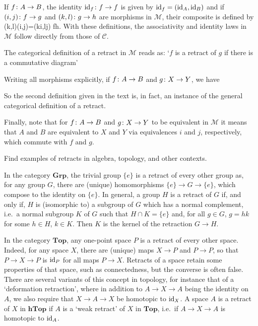 If $f\colon A\to B$, the identity $\mathrm{id}_f\colon f\to f$ is given by $\mathrm{id}_f=(\mathrm{id}_A,\mathrm{id}_B)$ and if $(i,j)\colon f\to g$ and $(k,l)\colon g\to h$ are morphisms in $\mathcal{M}$, their composite is defined by
\bse
(k,l)\circ (i,j)=(k\circ i,l\circ j) \cl f\to h.
\ese
With these definitions, the associativity and identity laws in $\mathcal{M}$ follow directly from those of $\mathcal{C}$.

The categorical definition of a retract in $\mathcal{M}$ reads as: `$f$ is a retract of $g$ if there is a commutative diagram'
\bse
{}
\ese
Writing all morphisms explicitly, if $f\colon A\to B$ and $g\colon X\to Y$, we have
\bse
{}
\ese
So the second definition given in the text is, in fact, an instance of the general categorical definition of a retract.

Finally, note that for $f\colon A\to B$ and $g\colon X\to Y$ to be equivalent in $\mathcal{M}$ it means that $A$ and $B$ are equivalent to $X$ and $Y$ via equivalences $i$ and $j$, respectively, which commute with $f$ and $g$.
\es

\bx
Find examples of retracts in algebra, topology, and other contexts.
\ex

\bs
In the category $\mathbf{Grp}$, the trivial group $\{e\}$ is a retract of every other group as, for any group $G$, there are (unique) homomorphisms $\{e\} \to G \to \{e\}$, which compose to the identity on $\{e\}$. In general, a group $H$ is a retract of $G$ if, and only if, $H$ is (isomorphic to) a subgroup of $G$ which has a normal complement, i.e.\ a normal subgroup $K$ of $G$ such that $H\cap K=\{e\}$ and, for all $g\in G$, $g=hk$ for some $h\in H$, $k\in K$. Then $K$ is the kernel of the retraction $G\to H$.

In the category $\mathbf{Top}$, any one-point space $P$ is a retract of every other space. Indeed, for any space $X$, there are (unique) maps $X\to P$ and $P\to P$, so that $P\to X\to P$ is $\mathrm{id}_P$ for all maps $P\to X$. Retracts of a space retain some properties of that space, such as connectedness, but the converse is often false. There are several variants of this concept in topology, for instance that of a `deformation retraction', where in addition to $A\to X\to A$ being the identity on $A$, we also require that $X\to A\to X$ be homotopic to $\mathrm{id}_X$. A space $A$ is a retract of $X$ in $\mathbf{hTop}$ if $A$ is a `weak retract' of $X$ in $\mathbf{Top}$, i.e.\ if $A\to X\to A$ is homotopic to $\mathrm{id}_A$. 

